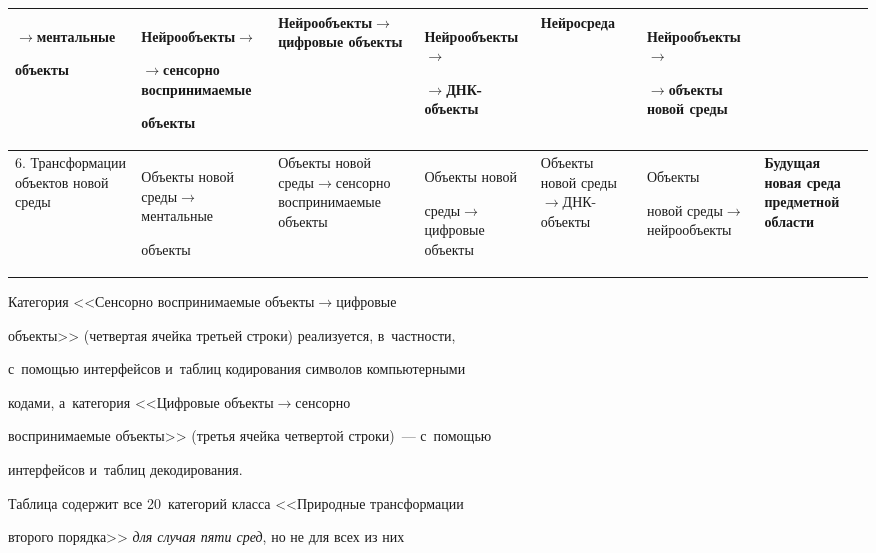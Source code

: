 \begin{table}
{\begin{sideways}
\begin{tabular}{|p{22mm}| p{24mm}| p{25mm}| p{25mm}| p{24mm}| p{25mm}| p{25mm}|}
$\to$\;мен\-таль\-ные 

объ\-екты&Ней\-ро\-объ\-ек\-ты\;$\to$\newline

$\to$\;сен\-сор\-но воспринимаемые 

объ\-екты&Ней\-ро\-объ\-ек\-ты\;$\to$\;циф\-ро\-вые объекты&Ней\-ро\-объ\-ек\-ты\;$\to$\newline

$\to$\;ДНК-объ\-ек\-ты&\textbf{Нейросреда}&Ней\-ро\-объ\-ек\-ты\;$\to$\newline

$\to$\;объ\-ек\-ты  но\-вой среды\\

\hline

6. Трансформации объектов новой среды&Объекты новой сре\-ды\;$\to$\;мен\-таль\-ные 

объекты&Объекты но\-вой сре\-ды\;$\to$\;сен\-сор\-но вос\-при\-ни\-ма\-емые объ\-екты&Объекты но\-вой 

сре\-ды\;$\to$\;циф\-ро\-вые объ\-екты&Объекты но\-вой сре\-ды\;$\to$\;ДНК-объ\-ек\-ты&Объекты 

новой сре\-ды\;$\to$\;ней\-ро\-объ\-ек\-ты&\textbf{Будущая новая среда предметной области}\\

\hline

\end{tabular}

\end{sideways}

}

\end{table}

  

  Категория <<Сенсорно воспринимаемые объ\-ек\-ты\;$\to$\;циф\-ро\-вые 

объекты>> (чет\-вер\-тая ячейка третьей строки) реализуется, в~част\-ности, 

с~помощью интерфейсов и~таб\-лиц кодирования символов компьютерными 

кодами, а~категория <<Цифровые объ\-ек\-ты\;$\to$\;сен\-сор\-но 

воспринимаемые объекты>> (третья ячейка четвертой строки)~--- с~по\-мощью 

интерфейсов и~таблиц декодирования.

   

  Таблица содержит все 20~категорий класса <<Природные трансформации 

второго порядка>> \textit{для случая пяти сред}, но не для всех из них 

